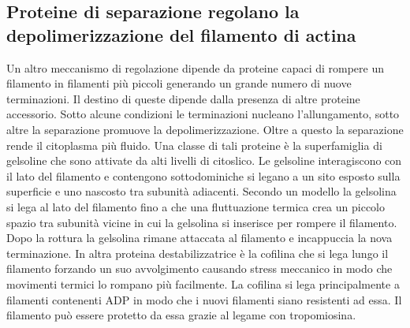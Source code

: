\subsection{Proteine di separazione regolano la depolimerizzazione del filamento di actina}
Un altro meccanismo di regolazione dipende da proteine capaci di rompere un filamento in filamenti pi\`u piccoli generando un grande numero di nuove terminazioni. Il destino di queste
dipende dalla presenza di altre proteine accessorio. Sotto alcune condizioni le terminazioni nucleano l'allungamento, sotto altre la separazione promuove la depolimerizzazione. Oltre
a questo la separazione rende il citoplasma pi\`u fluido. Una classe di tali proteine \`e la superfamiglia di gelsoline che sono attivate da alti livelli di  citoslico. 
Le gelsoline interagiscono con il lato del filamento e contengono sottodominiche si legano a un sito esposto sulla superficie e uno nascosto tra subunit\`a adiacenti. Secondo un
modello la gelsolina si lega al lato del filamento fino a che una fluttuazione termica crea un piccolo spazio tra subunit\`a vicine in cui la gelsolina si inserisce per rompere 
il filamento. Dopo la rottura la gelsolina rimane attaccata al filamento e incappuccia la nova terminazione. In altra proteina destabilizzatrice \`e la cofilina che si lega lungo 
il filamento forzando un suo avvolgimento causando stress meccanico in modo che movimenti termici lo rompano pi\`u facilmente. La cofilina si lega principalmente a filamenti contenenti
ADP in modo che i nuovi filamenti siano resistenti ad essa. Il filamento pu\`o essere protetto da essa grazie al legame con tropomiosina. 
